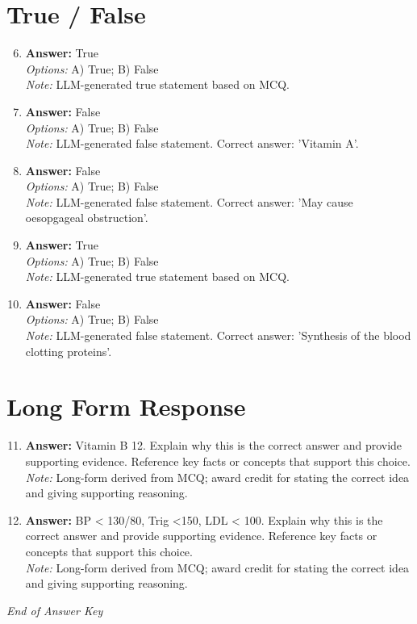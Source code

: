\documentclass[12pt]{article}
\begin{document}
\section*{True / False}
\begin{enumerate}[label=\arabic*.]
\setcounter{enumi}{5}
\item \textbf{Answer:} True
\\ \textit{Options:} A) True; B) False
\\ \textit{Note:} LLM-generated true statement based on MCQ.
\item \textbf{Answer:} False
\\ \textit{Options:} A) True; B) False
\\ \textit{Note:} LLM-generated false statement. Correct answer: 'Vitamin A'.
\item \textbf{Answer:} False
\\ \textit{Options:} A) True; B) False
\\ \textit{Note:} LLM-generated false statement. Correct answer: 'May cause oesopgageal obstruction'.
\item \textbf{Answer:} True
\\ \textit{Options:} A) True; B) False
\\ \textit{Note:} LLM-generated true statement based on MCQ.
\item \textbf{Answer:} False
\\ \textit{Options:} A) True; B) False
\\ \textit{Note:} LLM-generated false statement. Correct answer: 'Synthesis of the blood clotting proteins'.
\end{enumerate}

\section*{Long Form Response}
\begin{enumerate}[label=\arabic*.]
\setcounter{enumi}{10}
\item \textbf{Answer:} Vitamin B 12. Explain why this is the correct answer and provide supporting evidence. Reference key facts or concepts that support this choice.
\\ \textit{Note:} Long-form derived from MCQ; award credit for stating the correct idea and giving supporting reasoning.
\item \textbf{Answer:} BP \textless{} 130/80, Trig \textless{}150, LDL \textless{} 100. Explain why this is the correct answer and provide supporting evidence. Reference key facts or concepts that support this choice.
\\ \textit{Note:} Long-form derived from MCQ; award credit for stating the correct idea and giving supporting reasoning.
\end{enumerate}

\vfill
\noindent\textit{End of Answer Key}
\end{document}

